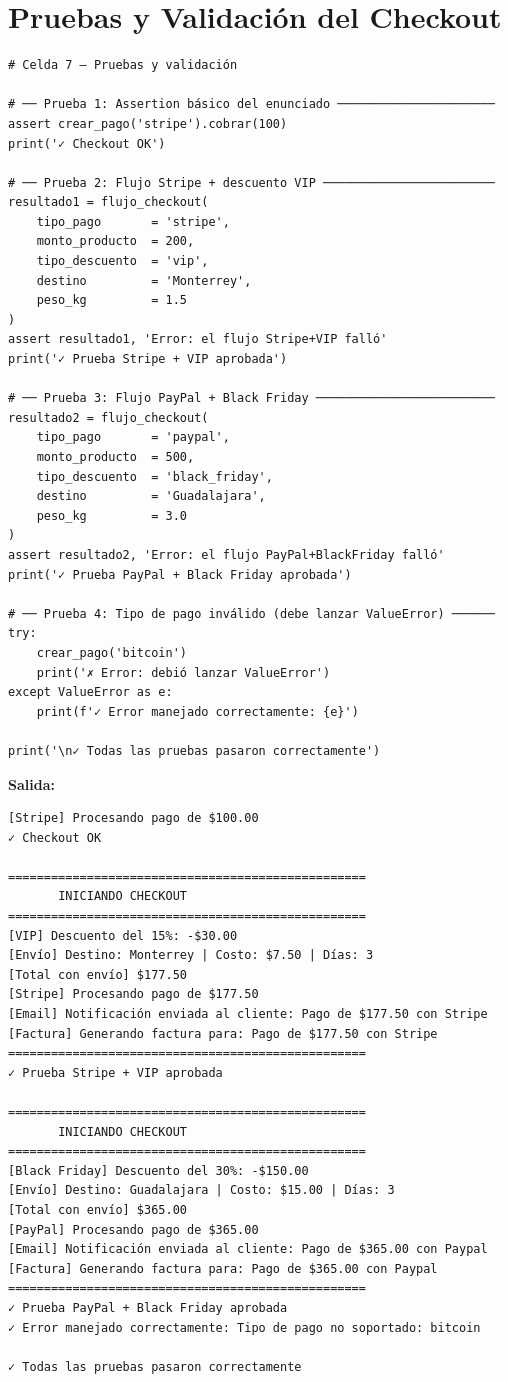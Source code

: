 \documentclass[letterpaper,11pt]{article}
\begin{document}
\section{Pruebas y Validación del Checkout}


\begin{lstlisting}[style=pythonreport]
# Celda 7 – Pruebas y validación

# ── Prueba 1: Assertion básico del enunciado ──────────────────────
assert crear_pago('stripe').cobrar(100)
print('✓ Checkout OK')

# ── Prueba 2: Flujo Stripe + descuento VIP ────────────────────────
resultado1 = flujo_checkout(
    tipo_pago       = 'stripe',
    monto_producto  = 200,
    tipo_descuento  = 'vip',
    destino         = 'Monterrey',
    peso_kg         = 1.5
)
assert resultado1, 'Error: el flujo Stripe+VIP falló'
print('✓ Prueba Stripe + VIP aprobada')

# ── Prueba 3: Flujo PayPal + Black Friday ─────────────────────────
resultado2 = flujo_checkout(
    tipo_pago       = 'paypal',
    monto_producto  = 500,
    tipo_descuento  = 'black_friday',
    destino         = 'Guadalajara',
    peso_kg         = 3.0
)
assert resultado2, 'Error: el flujo PayPal+BlackFriday falló'
print('✓ Prueba PayPal + Black Friday aprobada')

# ── Prueba 4: Tipo de pago inválido (debe lanzar ValueError) ──────
try:
    crear_pago('bitcoin')
    print('✗ Error: debió lanzar ValueError')
except ValueError as e:
    print(f'✓ Error manejado correctamente: {e}')

print('\n✓ Todas las pruebas pasaron correctamente')
\end{lstlisting}
\par\noindent\textbf{Salida:}
\begin{lstlisting}[style=reportoutput,language={}]
[Stripe] Procesando pago de $100.00
✓ Checkout OK

==================================================
       INICIANDO CHECKOUT
==================================================
[VIP] Descuento del 15%: -$30.00
[Envío] Destino: Monterrey | Costo: $7.50 | Días: 3
[Total con envío] $177.50
[Stripe] Procesando pago de $177.50
[Email] Notificación enviada al cliente: Pago de $177.50 con Stripe
[Factura] Generando factura para: Pago de $177.50 con Stripe
==================================================
✓ Prueba Stripe + VIP aprobada

==================================================
       INICIANDO CHECKOUT
==================================================
[Black Friday] Descuento del 30%: -$150.00
[Envío] Destino: Guadalajara | Costo: $15.00 | Días: 3
[Total con envío] $365.00
[PayPal] Procesando pago de $365.00
[Email] Notificación enviada al cliente: Pago de $365.00 con Paypal
[Factura] Generando factura para: Pago de $365.00 con Paypal
==================================================
✓ Prueba PayPal + Black Friday aprobada
✓ Error manejado correctamente: Tipo de pago no soportado: bitcoin

✓ Todas las pruebas pasaron correctamente
\end{lstlisting}
\end{document}

